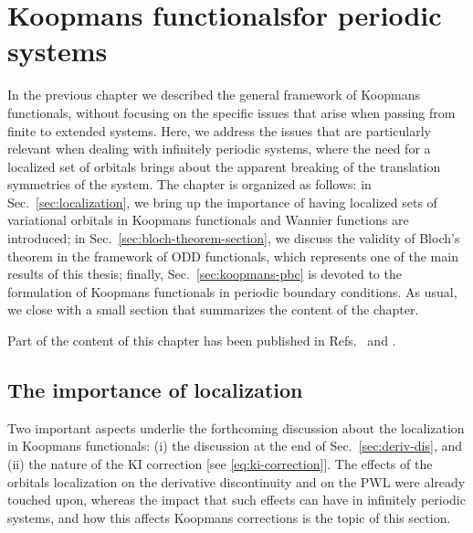 \cleardoublepage
\chapter[Koopmans functionals for periodic systems]{Koopmans functionals\break for periodic systems\label{ch:koopmans-periodic}}
In the previous chapter we described the general framework of Koopmans functionals, without focusing on the specific issues that arise when passing from finite to extended systems. Here, we address the issues that are particularly relevant when dealing with infinitely periodic systems, where the need for a localized set of orbitals brings about the apparent breaking of the translation symmetries of the system. The chapter is organized as follows: in Sec.~\ref{sec:localization}, we bring up the importance of having localized sets of variational orbitals in Koopmans functionals and Wannier functions are introduced; in Sec.~\ref{sec:bloch-theorem-section}, we discuss the validity of Bloch's theorem in the framework of ODD functionals, which represents one of the main results of this thesis; finally, Sec.~\ref{sec:koopmans-pbc} is devoted to the formulation of Koopmans functionals in periodic boundary conditions. As usual, we close with a small section that summarizes the content of the chapter.

Part of the content of this chapter has been published in Refs.~\cite{de_gennaro_blochs_2022} and \cite{colonna_koopmans_2022}.

\clearpage
\section{The importance of localization\label{sec:localization}}
Two important aspects underlie the forthcoming discussion about the localization in Koopmans functionals: (i) the discussion at the end of Sec.~\ref{sec:deriv-dis}, and (ii) the nature of the KI correction [see \cref{eq:ki-correction}]. The effects of the orbitals localization on the derivative discontinuity and on the PWL were already touched upon, whereas the impact that such effects can have in infinitely periodic systems, and how this affects Koopmans corrections is the topic of this section.

